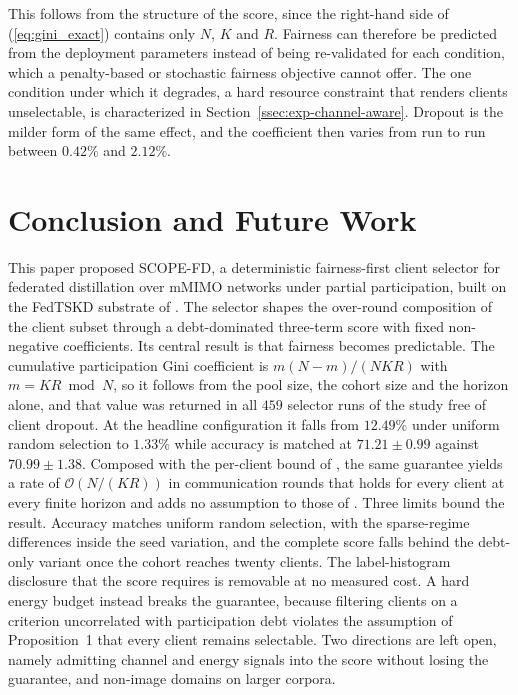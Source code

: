 \documentclass[journal]{IEEEtran}
\newcommand{\rev}[1]{{\color{blue}#1}}
\begin{document}
\rev{This follows from the structure of the score, since the right-hand side of (\ref{eq:gini_exact}) contains only $N$, $K$ and $R$. Fairness can therefore be predicted from the deployment parameters instead of being re-validated for each condition, which a penalty-based or stochastic fairness objective cannot offer. The one condition under which it degrades, a hard resource constraint that renders clients unselectable, is characterized in Section~\ref{ssec:exp-channel-aware}. Dropout is the milder form of the same effect, and the coefficient then varies from run to run between $0.42\%$ and $2.12\%$.}

\section{Conclusion and Future Work}
\label{sec:conclusion}
\rev{This paper proposed SCOPE-FD, a deterministic fairness-first client selector for federated distillation over mMIMO networks under partial participation, built on the FedTSKD substrate of \cite{mu2024fedtskd}. The selector shapes the over-round composition of the client subset through a debt-dominated three-term score with fixed non-negative coefficients. Its central result is that fairness becomes predictable. The cumulative participation Gini coefficient is $m(N-m)/(NKR)$ with $m = KR \bmod N$, so it follows from the pool size, the cohort size and the horizon alone, and that value was returned in all $459$ selector runs of the study free of client dropout. At the headline configuration it falls from $12.49\%$ under uniform random selection to $1.33\%$ while accuracy is matched at $71.21 \pm 0.99$ against $70.99 \pm 1.38$. Composed with the per-client bound of \cite{mu2024fedtskd}, the same guarantee yields a rate of $\mathcal{O}(N/(KR))$ in communication rounds that holds for every client at every finite horizon and adds no assumption to those of \cite{mu2024fedtskd}. Three limits bound the result. Accuracy matches uniform random selection, with the sparse-regime differences inside the seed variation, and the complete score falls behind the debt-only variant once the cohort reaches twenty clients. The label-histogram disclosure that the score requires is removable at no measured cost. A hard energy budget instead breaks the guarantee, because filtering clients on a criterion uncorrelated with participation debt violates the assumption of Proposition~1 that every client remains selectable. Two directions are left open, namely admitting channel and energy signals into the score without losing the guarantee, and non-image domains on larger corpora.}

\balance

\let\OLDthebibliography\thebibliography
\renewcommand\thebibliography[1]{%
  \OLDthebibliography{#1}%
  \scriptsize
  \setlength{\itemsep}{0pt plus 0.2ex}%
  \setlength{\parsep}{0pt}}

\end{document}
